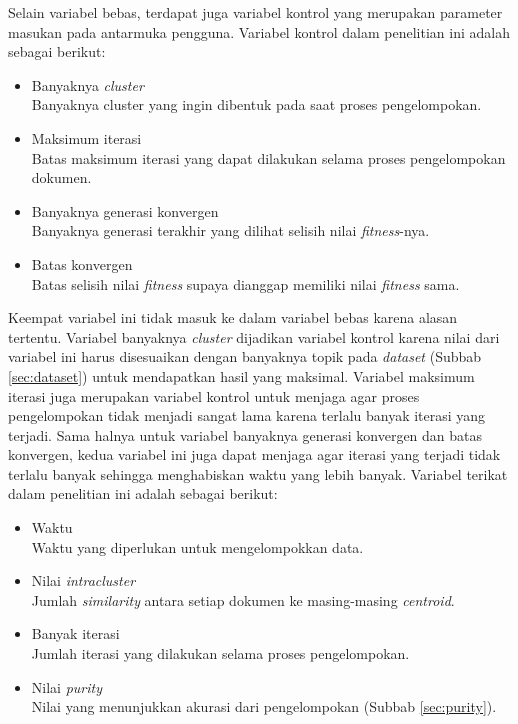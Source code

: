 Selain variabel bebas, terdapat juga variabel kontrol yang merupakan parameter masukan pada antarmuka pengguna. Variabel kontrol dalam penelitian ini adalah sebagai berikut:

\begin{itemize}
	\item Banyaknya \textit{cluster} \\
	Banyaknya cluster yang ingin dibentuk pada saat proses pengelompokan.
	\item Maksimum iterasi \\
	Batas maksimum iterasi yang dapat dilakukan selama proses pengelompokan dokumen.
	\item Banyaknya generasi konvergen \\
	Banyaknya generasi terakhir yang dilihat selisih nilai \textit{fitness}-nya.
	\item Batas konvergen \\
	Batas selisih nilai \textit{fitness} supaya dianggap memiliki nilai \textit{fitness} sama.
\end{itemize}

Keempat variabel ini tidak masuk ke dalam variabel bebas karena alasan tertentu. Variabel banyaknya \textit{cluster} dijadikan variabel kontrol karena nilai dari variabel ini harus disesuaikan dengan banyaknya topik pada \textit{dataset} (Subbab \ref{sec:dataset}) untuk mendapatkan hasil yang maksimal. Variabel maksimum iterasi juga merupakan variabel kontrol untuk menjaga agar proses pengelompokan tidak menjadi sangat lama karena terlalu banyak iterasi yang terjadi. Sama halnya untuk variabel banyaknya generasi konvergen dan batas konvergen, kedua variabel ini juga dapat menjaga agar iterasi yang terjadi tidak terlalu banyak sehingga menghabiskan waktu yang lebih banyak. Variabel terikat dalam penelitian ini adalah sebagai berikut:

\begin{itemize}
	\item Waktu \\
	Waktu yang diperlukan untuk mengelompokkan data.
	\item Nilai \textit{intracluster} \\
	Jumlah \textit{similarity} antara setiap dokumen ke masing-masing \textit{centroid}.
	\item Banyak iterasi \\
	Jumlah iterasi yang dilakukan selama proses pengelompokan.
	\item Nilai \textit{purity} \\
	Nilai yang menunjukkan akurasi dari pengelompokan (Subbab \ref{sec:purity}).
\end{itemize}

